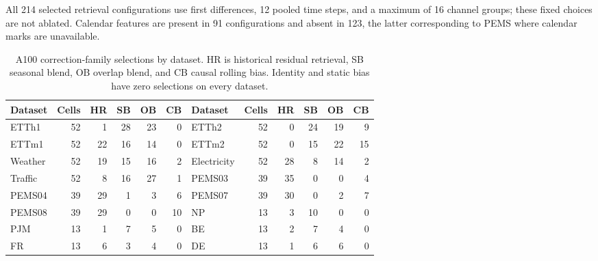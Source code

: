 All 214 selected retrieval configurations use first differences, 12 pooled
time steps, and a maximum of 16 channel groups; these fixed choices are not
ablated. Calendar features are present in 91 configurations and absent in 123,
the latter corresponding to PEMS where calendar marks are unavailable.

\begin{table}[h]
\centering
\footnotesize
\setlength{\tabcolsep}{4pt}
\caption{A100 correction-family selections by dataset. HR is historical
residual retrieval, SB seasonal blend, OB overlap blend, and CB causal rolling
bias. Identity and static bias have zero selections on every dataset.}
\label{tab:dataset-policy-selection}
\begin{tabular}{lrrrrr@{\qquad}lrrrrr}
\toprule
Dataset & Cells & HR & SB & OB & CB &
Dataset & Cells & HR & SB & OB & CB\\
\midrule
ETTh1       & 52 & 1  & 28 & 23 & 0 &
ETTh2       & 52 & 0  & 24 & 19 & 9\\
ETTm1       & 52 & 22 & 16 & 14 & 0 &
ETTm2       & 52 & 0  & 15 & 22 & 15\\
Weather     & 52 & 19 & 15 & 16 & 2 &
Electricity & 52 & 28 & 8  & 14 & 2\\
Traffic     & 52 & 8  & 16 & 27 & 1 &
PEMS03      & 39 & 35 & 0  & 0  & 4\\
PEMS04      & 39 & 29 & 1  & 3  & 6 &
PEMS07      & 39 & 30 & 0  & 2  & 7\\
PEMS08      & 39 & 29 & 0  & 0  & 10 &
NP          & 13 & 3  & 10 & 0  & 0\\
PJM         & 13 & 1  & 7  & 5  & 0 &
BE          & 13 & 2  & 7  & 4  & 0\\
FR          & 13 & 6  & 3  & 4  & 0 &
DE          & 13 & 1  & 6  & 6  & 0\\
\bottomrule
\end{tabular}
\end{table}

